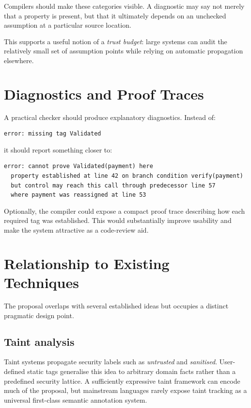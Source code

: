 \documentclass[11pt]{article}
\begin{document}
Compilers should make these categories visible. A diagnostic may say not merely that a property is present, but that it ultimately depends on an unchecked assumption at a particular source location.

This supports a useful notion of a \emph{trust budget}: large systems can audit the relatively small set of assumption points while relying on automatic propagation elsewhere.

\section{Diagnostics and Proof Traces}
A practical checker should produce explanatory diagnostics. Instead of:

\begin{lstlisting}
error: missing tag Validated
\end{lstlisting}

it should report something closer to:

\begin{lstlisting}
error: cannot prove Validated(payment) here
  property established at line 42 on branch condition verify(payment)
  but control may reach this call through predecessor line 57
  where payment was reassigned at line 53
\end{lstlisting}

Optionally, the compiler could expose a compact proof trace describing how each required tag was established. This would substantially improve usability and make the system attractive as a code-review aid.

\section{Relationship to Existing Techniques}
The proposal overlaps with several established ideas but occupies a distinct pragmatic design point.

\subsection{Taint analysis}
Taint systems propagate security labels such as \emph{untrusted} and \emph{sanitised}. User-defined static tags generalise this idea to arbitrary domain facts rather than a predefined security lattice. A sufficiently expressive taint framework can encode much of the proposal, but mainstream languages rarely expose taint tracking as a universal first-class semantic annotation system.
\end{document}

